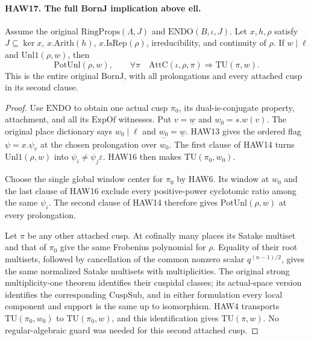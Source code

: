 \documentclass[11pt,a4paper]{article}
\numberwithin{equation}{section}
\theoremstyle{remark}\newtheorem{remark}[theorem]{Remark}
\begin{document}
\paragraph{HAW17. The full BornJ implication above ell.}
\label{claim:HAW17}
Assume the original $\mathrm{RingProps}(\Lambda,J)$ and
$\mathrm{ENDO}(B,\iota,J)$.  Let $x,h,\rho$ satisfy
$J\subseteq\ker x$, $x.\mathrm{Arith}(h)$,
$x.\mathrm{IsRep}(\rho)$, irreducibility, and continuity
of $\rho$.  If $w\mid\ell$ and
$\mathrm{Unl1}(\rho,w)$, then
\[
 \mathrm{PotUnl}(\rho,w),\qquad
 \forall\pi\quad\mathrm{AttC}(\iota,\rho,\pi)
                              \Longrightarrow\mathrm{TU}(\pi,w).
 \tag{HAW.28}
\]
This is the entire original $\mathrm{BornJ}$, with all
prolongations and every attached cusp in its second clause.
\begin{proof}
Use $\mathrm{ENDO}$ to obtain one actual cusp $\pi_0$,
its dual-is-conjugate property, attachment, and all its
$\mathrm{ExpOf}$ witnesses.  Put
$v=\underline w$ and $w_0=s.w(v)$.  The original place
dictionary says $w_0\mid\ell$ and
$\underline{w_0}=\underline w$.  HAW13 gives the ordered
flag $\psi=x.\psi_v$ at the chosen prolongation over $w_0$.
The first clause of HAW14 turns
$\mathrm{Unl1}(\rho,w)$ into
$\psi_i\ne\psi_j\varepsilon$.  HAW16 then makes
$\mathrm{TU}(\pi_0,w_0)$.

Choose the single global window center for $\pi_0$ by
HAW6.  Its window at $w_0$ and the last clause of HAW16
exclude every positive-power cyclotomic ratio among the
same $\psi_i$.  The second clause of HAW14 therefore gives
$\mathrm{PotUnl}(\rho,w)$ at every prolongation.

Let $\pi$ be any other attached cusp.  At cofinally many
places its Satake multiset and that of $\pi_0$ give the
same Frobenius polynomial for $\rho$.  Equality of their
root multisets, followed by cancellation of the common
nonzero scalar $q^{(n-1)/2}$, gives the same normalized
Satake multisets with multiplicities.  The original strong
multiplicity-one theorem identifies their cuspidal classes;
its actual-space version identifies the corresponding
$\mathrm{CuspSub}$, and in either formulation every local
component and support is the same up to isomorphism.
HAW4 transports $\mathrm{TU}(\pi_0,w_0)$ to
$\mathrm{TU}(\pi_0,w)$, and this identification gives
$\mathrm{TU}(\pi,w)$.  No regular-algebraic guard was
needed for this second attached cusp.
\end{proof}

\end{document}
